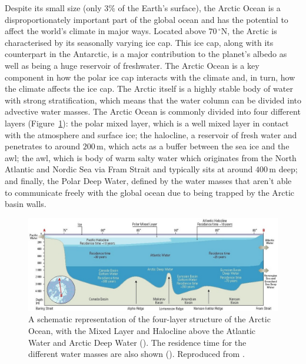 \documentclass[12pt,a4paper]{report}
\newcommand*\figref[1]{Figure~\ref{#1}}
\begin{document}
Despite its small size (only $3\%$ of the Earth's surface), the Arctic
Ocean is a disproportionately important part of the global ocean and has the potential
to affect the world's climate in major ways. Located above
$70\,^{\circ}\mathrm{N}$, the Arctic is characterised by its seasonally
varying ice cap. This ice cap, along with its counterpart in the
Antarctic, is a major contribution to the planet's albedo as well as being
a huge reservoir of freshwater. The Arctic Ocean is a key component
in how the polar ice cap interacts with the climate and, in turn, how
the climate affects the ice cap. 
The Arctic itself is a highly stable body of water with strong stratification, 
which means that the water column can be divided into advective water masses.
The Arctic Ocean is commonly divided into four different layers (\figref{fig:amap}):
the polar mixed layer, which is a well mixed layer in
contact with the atmosphere and surface ice; the halocline, a
reservoir of fresh water and penetrates to around $200\,\mathrm{m}$, which acts
as a buffer between the sea ice and the \gls{awl}; the \gls{awl},
which is body of warm salty water which originates from the North Atlantic and Nordic 
Sea via Fram Strait and typically sits at around $400\,\mathrm{m}$ deep; and finally, 
the Polar Deep Water, defined by the water masses that aren't
able to communicate freely with the global ocean due to being trapped by the Arctic basin walls.



\begin{figure}
	\centering
	\includegraphics[width=\linewidth]{amap}
	\caption[\cite{wilson1998amap}]{  A schematic representation of the four-layer structure of the Arctic Ocean, with the Mixed Layer and Halocline
		above the Atlantic Water and Arctic Deep Water (\cite{aagaard1989role}). 
		The residence time for the different water masses are also shown (\cite{bonisch1995deep}). Reproduced from \cite{wilson1998amap}.}
	\label{fig:amap}
\end{figure}
\end{document}
